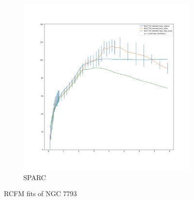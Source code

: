 \documentclass[reprint,%
 amsmath,amssymb,
 aps,
]{revtex4-1}
\begin{document}
\begin{figure}[h]
\begin{subfigure}{.5\textwidth}
  \centering
  \includegraphics[width=.8\linewidth]{NGC7793_rotmod-Copy1_XueSofue}
  \caption{SPARC\cite{2016Lelli}}
  \label{fig:sfig13}
\end{subfigure}
\caption{RCFM fits  of NGC 7793}
\label{fig:fig7793}
\end{figure}
%
%
%
%
\clearpage
\end{document}
